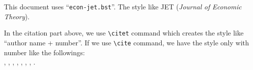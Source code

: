 \documentclass[10pt]{article}
\begin{document}
This document uses ``\verb|econ-jet.bst|''. The style like JET ({\itshape Journal of
Economic Theory}).

\vspace{1em}


\vspace*{1em}

In the citation part above, we use
\verb|\citet| command which creates the style like ``author name + number''. If we use \verb|\cite|
command, we have the style only with number like the followings: \\
\cite{Ryza15:_advan_analy_spark_patter_learn_data_scale},
\cite{yamazaki13:_japan}, \cite{stakeda2013web}, \cite{Takeda2012a},
\cite{bergemann11:_ration}, \cite{goldin:katz:2011}, \cite{Takeda2011b},
\cite{takeda2011c}.

\nocite{*}



\end{document}
